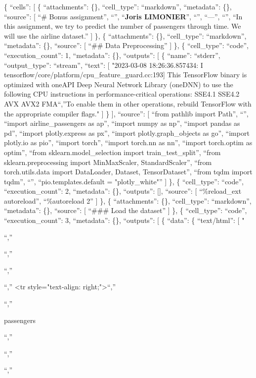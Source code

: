 \documentclass[
]{article}
\author{}
\date{\vspace{-2.5em}}
\begin{document}
\{ ``cells'': {[} \{ ``attachments'': \{\}, ``cell\_type'':
``markdown'', ``metadata'': \{\}, ``source'': {[} ``\# Bonus
assignment\n'', ``\n'', ``\textbf{Joris LIMONIER}\n'', ``\n'',
``---\n'', ``\n'', ``In this assignment, we try to predict the number of
passengers through time. We will use the airline dataset.\n'' {]} \}, \{
``attachments'': \{\}, ``cell\_type'': ``markdown'', ``metadata'': \{\},
``source'': {[} ``\#\# Data Preprocessing'' {]} \}, \{ ``cell\_type'':
``code'', ``execution\_count'': 1, ``metadata'': \{\}, ``outputs'': {[}
\{ ``name'': ``stderr'', ``output\_type'': ``stream'', ``text'': {[}
"2023-03-08 18:26:36.857434: I
tensorflow/core/platform/cpu\_feature\_guard.cc:193{]} This TensorFlow
binary is optimized with oneAPI Deep Neural Network Library (oneDNN) to
use the following CPU instructions in performance-critical operations:
SSE4.1 SSE4.2 AVX AVX2 FMA\n``,''To enable them in other operations,
rebuild TensorFlow with the appropriate compiler flags.\n" {]} \} {]},
``source'': {[} ``from pathlib import Path\n'', ``\n'', ``import
airline\_passengers as ap\n'', ``import numpy as np\n'', ``import pandas
as pd\n'', ``import plotly.express as px\n'', ``import
plotly.graph\_objects as go\n'', ``import plotly.io as pio\n'', ``import
torch\n'', ``import torch.nn as nn\n'', ``import torch.optim as
optim\n'', ``from sklearn.model\_selection import
train\_test\_split\n'', ``from sklearn.preprocessing import
MinMaxScaler, StandardScaler\n'', ``from torch.utils.data import
DataLoader, Dataset, TensorDataset\n'', ``from tqdm import tqdm\n'',
``\n'', ``pio.templates.default = "plotly\_white"'' {]} \}, \{
``cell\_type'': ``code'', ``execution\_count'': 2, ``metadata'': \{\},
``outputs'': {[}{]}, ``source'': {[} ``\%reload\_ext autoreload\n'',
``\%autoreload 2'' {]} \}, \{ ``attachments'': \{\}, ``cell\_type'':
``markdown'', ``metadata'': \{\}, ``source'': {[} ``\#\#\# Load the
dataset\n'' {]} \}, \{ ``cell\_type'': ``code'', ``execution\_count'':
3, ``metadata'': \{\}, ``outputs'': {[} \{ ``data'': \{ ``text/html'':
{[} "

\n``,''

\n``,''

\n``,''

\n``,'' \textless tr style="text-align: right;"\textgreater{}\n``,''

\n``,''

passengers

\n``,''

\n``,''

\n``,''
\end{document}
